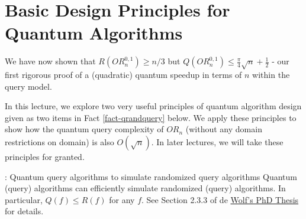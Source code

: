 \section{Basic Design Principles for Quantum Algorithms}
We have now shown that $R(OR_n^{0, 1}) \geq n/3$ but $Q(OR_n^{0, 1}) \leq \frac{\pi}{4}\sqrt{n} + \frac{1}{2}$ - our first rigorous proof of a (quadratic) quantum speedup in terms of $n$ within the query model.

In this lecture, we explore two very useful principles of quantum algorithm design given as two items in Fact \ref{fact-qrandquery} below. We apply these principles to show how the quantum query complexity of $OR_n$ (without any domain restrictions on domain) is also $O(\sqrt{n})$. In later lectures, we will take these principles for granted.

\begin{factbox}{: Quantum query algorithms to simulate randomized query algorithms}\label{fact-qrandquery}
    Quantum (query) algorithms can efficiently simulate randomized (query) algorithms. In particular, $Q(f) \leq R(f)$ for any $f$. See Section 2.3.3 of de \href{https://homepages.cwi.nl/~rdewolf/publ/qc/phd.pdf}{Wolf's PhD Thesis} for details.
\end{factbox}

